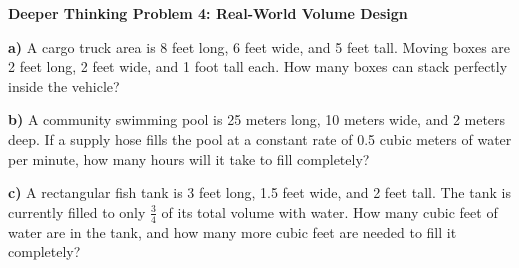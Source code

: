 \documentclass[12pt, letterpaper, fleqn]{article}
\begin{document}
\begin{tcolorbox}[colback=white, colframe=black, boxrule=1pt, arc=4mm, left=6mm, right=6mm, top=5mm, bottom=5mm]
\textbf{Deeper Thinking Problem 4: Real-World Volume Design}

\medskip
\noindent
\textbf{a)} A cargo truck area is 8 feet long, 6 feet wide, and 5 feet tall. Moving boxes are 2 feet long, 2 feet wide, and 1 foot tall each. How many boxes can stack perfectly inside the vehicle?
\vspace{5cm}

\noindent
\textbf{b)} A community swimming pool is 25 meters long, 10 meters wide, and 2 meters deep. If a supply hose fills the pool at a constant rate of 0.5 cubic meters of water per minute, how many hours will it take to fill completely?
\vspace{5cm}

\noindent
\textbf{c)} A rectangular fish tank is 3 feet long, 1.5 feet wide, and 2 feet tall. The tank is currently filled to only $\frac{3}{4}$ of its total volume with water. How many cubic feet of water are in the tank, and how many more cubic feet are needed to fill it completely?
\vspace{5cm}

\end{tcolorbox}
\end{document}
